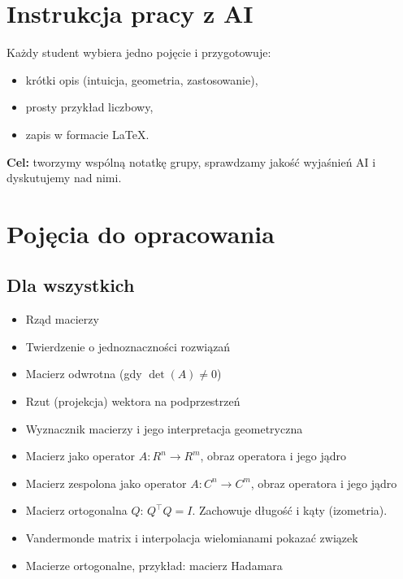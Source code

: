 \documentclass[12pt]{article}
\begin{document}
\vspace{1em}
\section*{Instrukcja pracy z AI}
Każdy student wybiera jedno pojęcie i przygotowuje:
\begin{itemize}
  \item krótki opis (intuicja, geometria, zastosowanie),
  \item prosty przykład liczbowy,
  \item zapis w formacie \LaTeX.
\end{itemize}

\textbf{Cel:} tworzymy wspólną notatkę grupy, sprawdzamy jakość wyjaśnień AI i dyskutujemy nad nimi.

\vspace{1em}
\section*{Pojęcia do opracowania}

\subsection*{Dla wszystkich}
\begin{itemize}[label=$\triangleright$]
\item Rząd macierzy
\item Twierdzenie o jednoznaczności rozwiązań
\item Macierz odwrotna (gdy $\det(A)\neq 0$)
\item Rzut (projekcja) wektora na podprzestrzeń
\item Wyznacznik macierzy i jego interpretacja geometryczna
\item Macierz jako operator
$A:R^n \to R^m$, obraz operatora i jego jądro
\item Macierz zespolona jako operator
$A:C^n \to C^m$, obraz operatora i jego jądro
\item Macierz ortogonalna \(Q\): \(Q^\top Q = I\). Zachowuje długość i kąty (izometria).
\item Vandermonde matrix i interpolacja wielomianami pokazać związek
\item Macierze ortogonalne, przykład: macierz Hadamara
\end{itemize}
\end{document}
